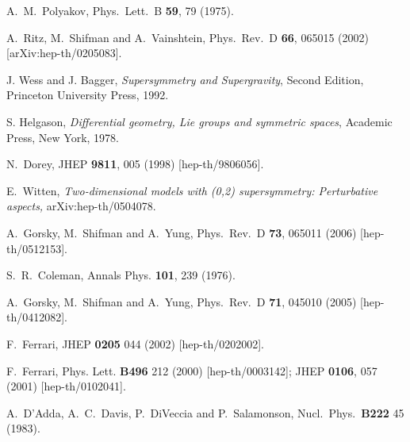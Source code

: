 \documentclass[epsfig,12pt]{article}
\newcommand{\cpn}{CP$(N-1)\,$}
\begin{document}
{\begin{thebibliography}{99}
 A.~M.~Polyakov,
  Phys.\ Lett.\  B {\bf 59}, 79 (1975).
  
  A.~Ritz, M.~Shifman and A.~Vainshtein,
  Phys.\ Rev.\  D {\bf 66}, 065015 (2002)
  [arXiv:hep-th/0205083].
  
J. Wess and J. Bagger, {\em Supersymmetry and Supergravity}, Second Edition,
Princeton University Press, 1992.

S. Helgason, {\sl Differential geometry, Lie groups and symmetric spaces},
Academic Press, New York, 1978.
  
N.~Dorey,
JHEP {\bf 9811}, 005 (1998) [hep-th/9806056].

  E.~Witten,
{\em Two-dimensional models with (0,2) supersymmetry: Perturbative aspects,}
  arXiv:hep-th/0504078.
  
A.~Gorsky, M.~Shifman and A.~Yung,
Phys.\ Rev.\ D {\bf 73}, 065011 (2006)
[hep-th/0512153].

S.~R.~Coleman,
Annals Phys.  {\bf 101}, 239 (1976).

A.~Gorsky, M.~Shifman and A.~Yung,
Phys.\ Rev.\ D {\bf 71}, 045010 (2005)
[hep-th/0412082].

F.~Ferrari,
JHEP {\bf 0205} 044 (2002)
[hep-th/0202002].

F.~Ferrari,
 Phys. Lett. {\bf B496} 212 (2000)
[hep-th/0003142];
JHEP {\bf 0106}, 057 (2001)
[hep-th/0102041].

A.~D'Adda, A.~C.~Davis, P.~DiVeccia and P.~Salamonson,
Nucl.\ Phys.\ {\bf B222} 45 (1983).


\end{thebibliography}}
\end{document}
